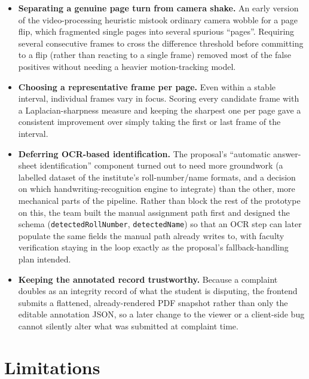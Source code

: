 \documentclass[11pt,a4paper]{article}
\begin{document}
\begin{itemize}[leftmargin=0.7cm]
  \item \textbf{Separating a genuine page turn from camera shake.} An early
    version of the video-processing heuristic mistook ordinary camera wobble
    for a page flip, which fragmented single pages into several spurious
    ``pages''. Requiring several consecutive frames to cross the difference
    threshold before committing to a flip (rather than reacting to a single
    frame) removed most of the false positives without needing a heavier
    motion-tracking model.
  \item \textbf{Choosing a representative frame per page.} Even within a
    stable interval, individual frames vary in focus. Scoring every candidate
    frame with a Laplacian-sharpness measure and keeping the sharpest one per
    page gave a consistent improvement over simply taking the first or last
    frame of the interval.
  \item \textbf{Deferring OCR-based identification.} The proposal's
    ``automatic answer-sheet identification'' component turned out to need
    more groundwork (a labelled dataset of the institute's roll-number/name
    formats, and a decision on which handwriting-recognition engine to
    integrate) than the other, more mechanical parts of the pipeline. Rather
    than block the rest of the prototype on this, the team built the manual
    assignment path first and designed the schema
    (\texttt{detectedRollNumber}, \texttt{detectedName}) so that an OCR step
    can later populate the same fields the manual path already writes to,
    with faculty verification staying in the loop exactly as the proposal's
    fallback-handling plan intended.
  \item \textbf{Keeping the annotated record trustworthy.} Because a
    complaint doubles as an integrity record of what the student is disputing,
    the frontend submits a flattened, already-rendered PDF snapshot rather
    than only the editable annotation JSON, so a later change to the viewer
    or a client-side bug cannot silently alter what was submitted at
    complaint time.
\end{itemize}

\section{Limitations}
\label{sec:limitations}
\end{document}

